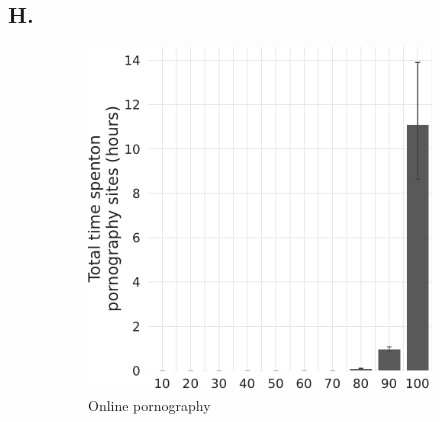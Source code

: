 \documentclass[12pt,twoside]{article}
\begin{document}
\subsection{H. \smHTitle{}}\label{sm:smH}
\begin{figure}[!ht]
\label{fig:distribution_duration_on_adultsites_fullsample_mar}
     \centering
     \begin{subfigure}[b]{0.495\textwidth}
         \centering
         \includegraphics[width=\textwidth]{figs/mar/distribution_duration_on_adultsites_fullsample.pdf}
         \caption{Online pornography}
     \end{subfigure}
     \hfill
     \begin{subfigure}[b]{0.495\textwidth}
         \centering

\end{subfigure}
\end{figure}
\end{document}
